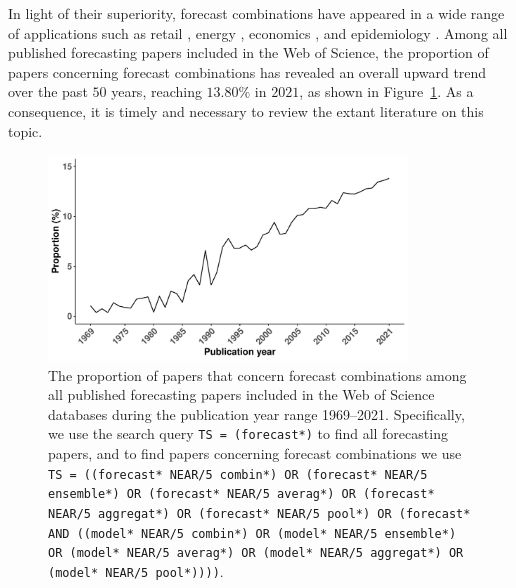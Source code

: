 \documentclass[a4paper,11pt]{article}
\begin{document}
In light of their superiority, forecast combinations have appeared in a wide range of applications such as retail \citep{Ma2021-np}, energy \citep{Xie2016-fb}, economics \citep{Aastveit2018-lf}, and epidemiology \citep{Ray2022-co}. Among all published forecasting papers included in the Web of Science, the proportion of papers concerning forecast combinations has revealed an overall upward trend over the past $50$ years, reaching $13.80\%$ in $2021$, as shown in Figure~\ref{fig:prop}. As a consequence, it is timely and necessary to review the extant literature on this topic.

\begin{figure}[!htb]
  \centering \includegraphics[width=0.85\textwidth]{prop}
  \caption{The proportion of papers that concern forecast combinations among all published forecasting papers included in the Web of Science databases during the publication year range 1969--2021. Specifically, we use the search query \texttt{TS = (forecast*)} to find all forecasting papers, and to find papers concerning forecast combinations we use \texttt{TS = ((forecast* NEAR/5 combin*) OR (forecast* NEAR/5 ensemble*) OR (forecast* NEAR/5 averag*) OR (forecast* NEAR/5 aggregat*) OR (forecast* NEAR/5 pool*) OR (forecast* AND ((model* NEAR/5 combin*) OR (model* NEAR/5 ensemble*) OR (model* NEAR/5 averag*) OR (model* NEAR/5 aggregat*) OR (model* NEAR/5 pool*))))}.}
  \label{fig:prop}
\end{figure}
\end{document}
